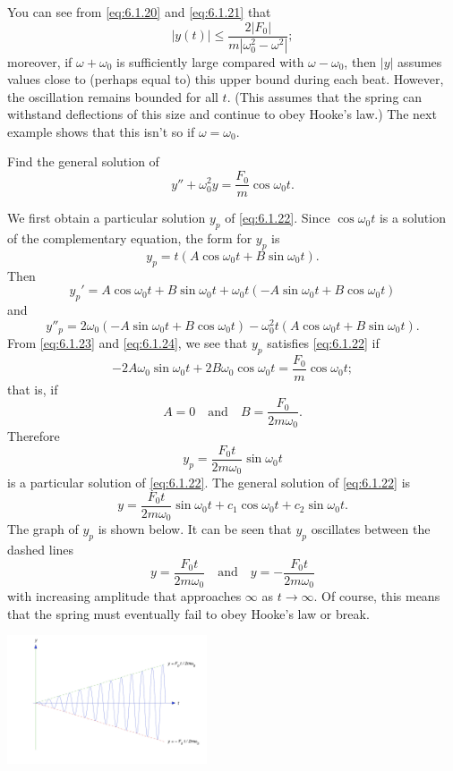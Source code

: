 \documentclass{ximera}
\begin{document}
\begin{example}
\begin{explanation}
You can see from
\eqref{eq:6.1.20} and \eqref{eq:6.1.21} that
$$
|y(t)|\leq\frac{2|F_0|}{m|\omega_0^2-\omega^2|};
$$
moreover, if $\omega+\omega_0$ is sufficiently large compared with $\omega
-\omega_0$, then $|y|$ assumes values close to (perhaps equal to) this
upper bound during each beat. However, the oscillation remains bounded for
all $t$. (This assumes that the spring can withstand
deflections of this size and continue to obey Hooke's law.)  The next
example shows that this isn't  so if $\omega=\omega_0$.

\end{explanation}
\end{example}



\begin{example}\label{example:6.1.5}
Find the general solution of
\begin{equation}\label{eq:6.1.22}
y''+\omega_0^2y=\frac{F_0}{m}\cos\omega_0t.
\end{equation}

\begin{explanation}
We first obtain a particular solution $y_p$ of \eqref{eq:6.1.22}. Since
$\cos\omega_0t$ is a solution of the complementary equation, the form
for $y_p$ is
\begin{equation}\label{eq:6.1.23}
y_p=t(A\cos\omega_0t+B\sin\omega_0t).
\end{equation}
 Then
$$
y_p'=A\cos\omega_0t+B\sin\omega_0t
+\omega_0t(-A\sin\omega_0t+B\cos\omega_0t)
$$
and
\begin{equation}\label{eq:6.1.24}
y''_p=2\omega_0(-A\sin\omega_0t
+B\cos\omega_0t)-\omega_0^2t(A\cos\omega_0t+B\sin\omega_0t).
\end{equation}
From \eqref{eq:6.1.23} and \eqref{eq:6.1.24}, we see that $y_p$ satisfies
\eqref{eq:6.1.22} if
$$
-2A\omega_0\sin\omega_0t+2B\omega_0\cos\omega_0t=\frac{F_0}{m}
\cos\omega_0t;
$$
that is, if
$$
A=0\quad\mbox{and}\quad B=\frac{F_0}{2m\omega_0}.
$$
Therefore
$$
y_p=\frac{F_0t}{2m\omega_0}\sin\omega_0t
$$
is a particular solution of \eqref{eq:6.1.22}. The general solution of
 \eqref{eq:6.1.22} is
$$
y=\frac{F_0t}{2m\omega_0}\sin\omega_0t+c_1\cos\omega_0t+c_2\sin\omega_0t.
$$
The graph of $y_p$ is shown below.  It can be
seen that $y_p$ oscillates between the dashed lines
$$
y=\frac{F_0t}{2m\omega_0}\quad\mbox{and}\quad y=-\frac{F_0t}{2m\omega_0}
$$
with increasing amplitude that approaches $\infty$ as $t\rightarrow\infty$. Of
course, this means that the spring must eventually fail to obey Hooke's law
or break.
\begin{image}
  \includegraphics[height=1.5in]{fig060107.jpg} 
\end{image}
\end{explanation}
\end{example}
\end{document}

